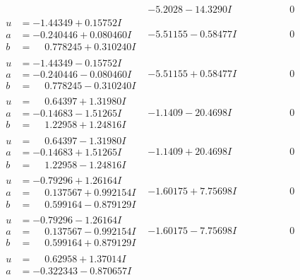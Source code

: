 \documentclass[1p]{elsarticle_modified}
\theoremstyle{definition}
\begin{document}
$$\begin{array}{c|c|c}
 & -5.2028 - 14.3290 I & \phantom{-0.000000 } 0 \\ \hline\begin{aligned}
u &= -1.44349 + 0.15752 I \\
a &= -0.240446 + 0.080460 I \\
b &= \phantom{-}0.778245 + 0.310240 I\end{aligned}
 & -5.51155 - 0.58477 I & \phantom{-0.000000 } 0 \\ \hline\begin{aligned}
u &= -1.44349 - 0.15752 I \\
a &= -0.240446 - 0.080460 I \\
b &= \phantom{-}0.778245 - 0.310240 I\end{aligned}
 & -5.51155 + 0.58477 I & \phantom{-0.000000 } 0 \\ \hline\begin{aligned}
u &= \phantom{-}0.64397 + 1.31980 I \\
a &= -0.14683 - 1.51265 I \\
b &= \phantom{-}1.22958 + 1.24816 I\end{aligned}
 & -1.1409 - 20.4698 I & \phantom{-0.000000 } 0 \\ \hline\begin{aligned}
u &= \phantom{-}0.64397 - 1.31980 I \\
a &= -0.14683 + 1.51265 I \\
b &= \phantom{-}1.22958 - 1.24816 I\end{aligned}
 & -1.1409 + 20.4698 I & \phantom{-0.000000 } 0 \\ \hline\begin{aligned}
u &= -0.79296 + 1.26164 I \\
a &= \phantom{-}0.137567 + 0.992154 I \\
b &= \phantom{-}0.599164 - 0.879129 I\end{aligned}
 & -1.60175 + 7.75698 I & \phantom{-0.000000 } 0 \\ \hline\begin{aligned}
u &= -0.79296 - 1.26164 I \\
a &= \phantom{-}0.137567 - 0.992154 I \\
b &= \phantom{-}0.599164 + 0.879129 I\end{aligned}
 & -1.60175 - 7.75698 I & \phantom{-0.000000 } 0 \\ \hline\begin{aligned}
u &= \phantom{-}0.62958 + 1.37014 I \\
a &= -0.322343 - 0.870657 I \\

\end{aligned}
\end{array}$$
\end{document}
